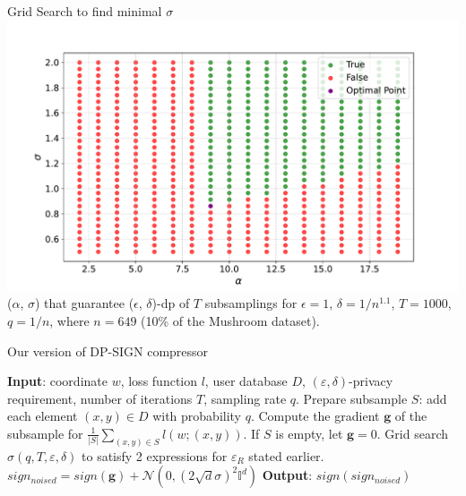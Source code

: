 \documentclass{beamer}
\newcommand{\eps}{\varepsilon}
\begin{document}
\begin{frame}{Grid Search to find minimal $\sigma$}
\includegraphics[width=1.0\textwidth]{grid_sigma_to_pres.pdf}
($\alpha$, $\sigma$) that guarantee ($\epsilon$, $\delta$)-dp of $T$ subsamplings for $\epsilon = 1$, $\delta = 1/n^{1.1}$, $T = 1000$, $q = 1/n$, where $n=649$ (10\% of the Mushroom dataset).

\end{frame}
\begin{frame}{Our version of DP-SIGN compressor}
\newcommand{\gradg}{\boldsymbol{g}}

    \begin{algorithmic}
        \STATE \textbf{Input}: coordinate $w$, loss function $l$, user database $D$, $(\eps, \delta)$-privacy requirement, number of iterations $T$, sampling rate $q$.
        \STATE Prepare subsample $S$: add each element $(x, y) \in D$ with probability $q$.
        \STATE Compute the gradient $\gradg$ of the subsample for $\frac{1}{|S|}\sum_{(x,y)\in S}l(w;(x,y))$. If $S$ is empty, let $\gradg = 0$.
        \STATE Grid search $\sigma(q, T, \eps, \delta)$ to satisfy 2 expressions for $\eps_R$ stated earlier.
        \STATE $sign_{noised} = sign(\gradg) + \mathcal{N}(0,(2\sqrt{d}\sigma)^2\mathbb{I}^d)$
        \STATE \textbf{Output}: $sign(sign_{noised})$
    \end{algorithmic}

\end{frame}
\end{document}
